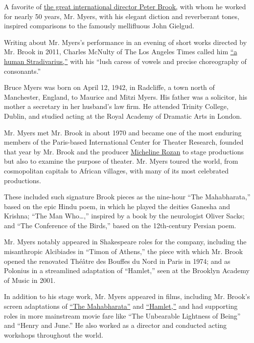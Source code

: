 A favorite of
\href{https://www.nytimes.com/2019/09/18/theater/peter-brook-interview.html}{the
great international director Peter Brook,} with whom he worked for
nearly 50 years, Mr. Myers, with his elegant diction and reverberant
tones, inspired comparisons to the famously mellifluous John Gielgud.

Writing about Mr. Myers's performance in an evening of short works
directed by Mr. Brook in 2011, Charles McNulty of The Los Angeles Times
called him
\href{https://latimesblogs.latimes.com/culturemonster/2011/04/theater-review-an-evening-of-peter-brook-at-the-broad-stage.html}{``a
human Stradivarius,''} with his ``lush caress of vowels and precise
choreography of consonants.''

Bruce Myers was born on April 12, 1942, in Radcliffe, a town north of
Manchester, England, to Maurice and Mitzi Myers. His father was a
solicitor, his mother a secretary in her husband's law firm. He attended
Trinity College, Dublin, and studied acting at the Royal Academy of
Dramatic Arts in London.

Mr. Myers met Mr. Brook in about 1970 and became one of the most
enduring members of the Paris-based International Center for Theater
Research, founded that year by Mr. Brook and the producer
\href{https://www.nytimes.com/2018/09/19/obituaries/micheline-rozan-dead.html}{Micheline
Rozan} to stage productions but also to examine the purpose of theater.
Mr. Myers toured the world, from cosmopolitan capitals to African
villages, with many of its most celebrated productions.

These included such signature Brook pieces as the nine-hour ``The
Mahabharata,'' based on the epic Hindu poem, in which he played the
deities Ganesha and Krishna; ``The Man Who\ldots{},'' inspired by a book
by the neurologist Oliver Sacks; and ``The Conference of the Birds,''
based on the 12th-century Persian poem.

Mr. Myers notably appeared in Shakespeare roles for the company,
including the misanthropic Alcibiades in ``Timon of Athens,'' the piece
with which Mr. Brook opened the renovated Théâtre des Bouffes du Nord in
Paris in 1974; and as Polonius in a streamlined adaptation of
``Hamlet,'' seen at the Brooklyn Academy of Music in 2001.

In addition to his stage work, Mr. Myers appeared in films, including
Mr. Brook's screen adaptations of
\href{https://www.youtube.com/watch?v=-va1S1cT1s4}{``The Mahabharata''}
and \href{https://www.youtube.com/watch?v=XSfRZmNPHoE}{``Hamlet,''} and
had supporting roles in more mainstream movie fare like ``The Unbearable
Lightness of Being'' and ``Henry and June.'' He also worked as a
director and conducted acting workshops throughout the world.


